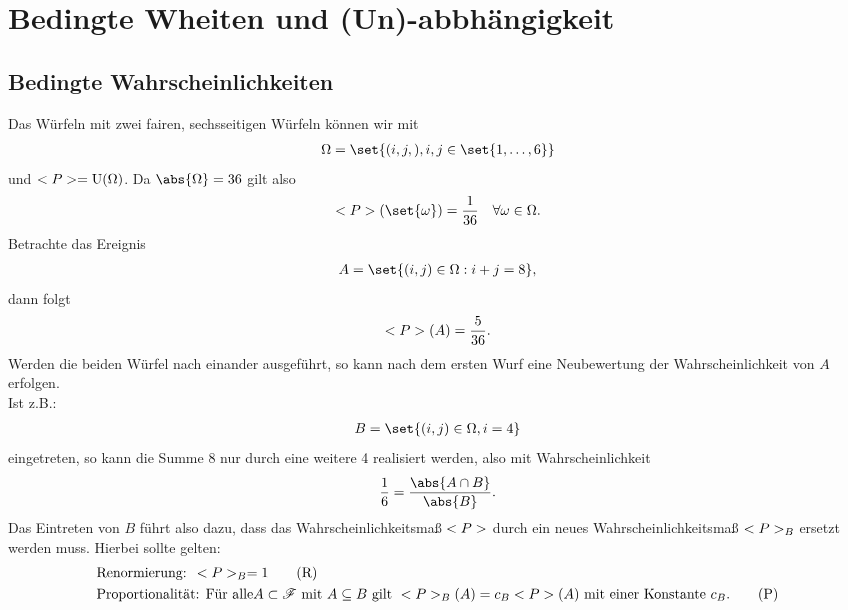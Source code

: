 \chapter[Bedingte Wahrscheinlichkeiten und (Un)-abbhängigkeit]{Bedingte Wheiten und (Un)-abbhängigkeit}

\section{Bedingte Wahrscheinlichkeiten}
\begin{example}
	Das Würfeln mit zwei fairen, sechsseitigen Würfeln können wir mit 
	\begin{align}
		\Omega = \set{(i,j,), i,j \in \set{1,\dots,6}}\notag
	\end{align}
	und $<P> = \operatorname{U}(\Omega)$. Da $\abs{\Omega} = 36$ gilt also
	\begin{align}
		\probp(\set{\omega}) = \frac{1}{36} \quad \forall \omega \in \Omega.\notag
	\end{align}
	Betrachte das Ereignis
	\begin{align}
		A = \set{(i,j) \in \Omega : i + j = 8},\notag
	\end{align}
	dann folgt
	\begin{align}
		<P>(A) = \frac{5}{36}.\notag
	\end{align}
	Werden die beiden Würfel nach einander ausgeführt, so kann nach dem ersten Wurf eine Neubewertung der Wahrscheinlichkeit von $A$ erfolgen.\\
	Ist z.B.:
	\begin{align}
		B = \set{(i,j) \in \Omega, i = 4}\notag
	\end{align}
	eingetreten, so kann die Summe 8 nur durch eine weitere 4 realisiert werden, also mit Wahrscheinlichkeit
	\begin{align}
		\frac{1}{6} = \frac{\abs{A \cap B}}{\abs{B}}.\notag 
	\end{align}
	Das Eintreten von $B$ führt also dazu, dass das Wahrscheinlichkeitsmaß $<P>$ durch ein neues Wahrscheinlichkeitsmaß $<P>_{B}$ ersetzt werden muss. Hierbei sollte gelten:
	\begin{align} %
		 &\text{Renormierung: }\probp_{B} = 1\label{Renorm}\tag{R}\\
		 &\text{Proportionalität: Für alle} A \subset \sigF \mit A \subseteq B \text{ gilt }
		 \probp_{B}(A) = c_B \probp(A) \text{ mit einer Konstante } c_B.\label{Prop}\tag{P}
    \end{align}
\end{example}

